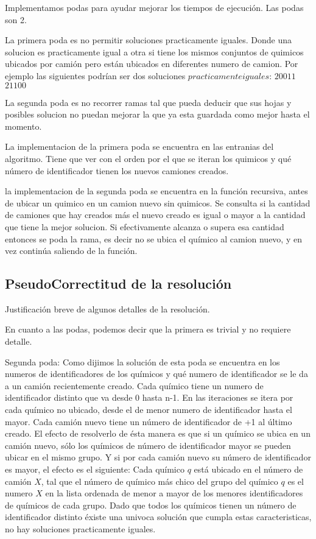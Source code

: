 \noindent
Implementamos podas para ayudar mejorar los tiempos de ejecuci\'on. Las podas son 2. 

\noindent
La primera poda es no permitir soluciones practicamente iguales. Donde una solucion es practicamente igual a otra si tiene los mismos conjuntos de quimicos ubicados por cami\'on pero est\'an ubicados en diferentes numero de camion. Por ejemplo las siguientes podr\'ian ser dos soluciones $practicamente iguales$:
$2 0 0 1 1$
$2 1 1 0 0$
 
\noindent
La segunda poda es no recorrer ramas tal que pueda deducir que sus hojas y posibles solucion no puedan mejorar la que ya esta guardada como mejor hasta el momento.

\noindent
La implementacion de la primera poda se encuentra en las entranias del algoritmo. Tiene que ver con el orden por el que se iteran los quimicos y qu\'e n\'umero de identificador tienen los nuevos camiones creados.

\noindent
la implementacion de la segunda poda se encuentra en la funci\'on recursiva, antes de ubicar un quimico en un camion nuevo sin quimicos. Se consulta si la cantidad de camiones que hay creados m\'as el nuevo creado es igual o mayor a la cantidad que tiene la mejor solucion. Si efectivamente alcanza o supera esa cantidad entonces se poda la rama, es decir no se ubica el qu\'imico al camion nuevo, y en vez contin\'ua saliendo de la funci\'on.


\subsection{PseudoCorrectitud de la resoluci\'on}

\noindent
Justificaci\'on breve de algunos detalles de la resoluci\'on.

\noindent
En cuanto a las podas, podemos decir que la primera es trivial y no requiere detalle.

Segunda poda: 
Como dijimos la soluci\'on de esta poda se encuentra en los numeros de identificadores de los qu\'imicos y qu\'e numero de identificador se le da a un cami\'on recientemente creado.
Cada qu\'imico tiene un numero de identificador distinto que va desde 0 hasta n-1. En las iteraciones se itera por cada qu\'imico no ubicado, desde el de menor numero de identificador hasta el mayor. 
Cada cami\'on nuevo tiene un n\'umero de identificador de +1 al \'ultimo creado. 
El efecto de resolverlo de \'esta manera es que si un qu\'imico se ubica en un cami\'on nuevo, s\'olo los qu\'imicos de n\'umero de identificador mayor se pueden ubicar en el mismo grupo. Y si por cada cami\'on nuevo su n\'umero de identificador es mayor, el efecto es el siguiente:
Cada qu\'imico $q$ est\'a ubicado en el n\'umero de cami\'on $X$, tal que el n\'umero de qu\'imico m\'as chico del grupo del qu\'imico $q$ es el numero $X$ en la lista ordenada de menor a mayor de los menores identificadores de qu\'imicos de cada grupo. Dado que todos los qu\'imicos tienen un n\'umero de identificador distinto \'existe una univoca soluci\'on que cumpla estas caracteristicas, no hay soluciones practicamente iguales.


